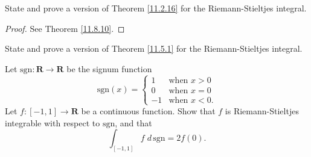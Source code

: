 \begin{exercise}\label{ex 11.8.3}
    State and prove a version of Theorem \ref{11.2.16} for the Riemann-Stieltjes integral.
\end{exercise}

\begin{proof}
    See Theorem \ref{11.8.10}.
\end{proof}

\begin{exercise}\label{ex 11.8.4}
    State and prove a version of Theorem \ref{11.5.1} for the Riemann-Stieltjes integral.
\end{exercise}

\begin{exercise}\label{ex 11.8.5}
    Let \(\text{sgn} : \mathbf{R} \to \mathbf{R}\) be the signum function
    \[
        \text{sgn}(x) = \begin{cases}
            1  & \text{when } x > 0  \\
            0  & \text{when } x = 0  \\
            -1 & \text{when } x < 0.
        \end{cases}
    \]
    Let \(f : [-1, 1] \to \mathbf{R}\) be a continuous function.
    Show that \(f\) is Riemann-Stieltjes integrable with respect to \(\text{sgn}\), and that
    \[
        \int_{[-1, 1]} f \; d \, \text{sgn} = 2f(0).
    \]
\end{exercise}